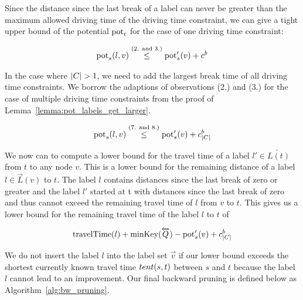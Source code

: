 Since the distance since the last break of a label can never be greater than the maximum allowed driving time of the driving time constraint, we can give a tight upper bound of the potential $\operatorname{pot}_t$ for the case of one driving time constraint:

\begin{align}
	\operatorname{pot}_s(l,v) \overset{\text{(2. and 3.)}}{\le} \operatorname{pot}'_s(v) + c^b
\end{align}

In the case where $|C| > 1$, we need to add the largest break time of all driving time constraints. We borrow the adaptions of observations (2.) and (3.) for the case of multiple driving time constraints from the proof of Lemma~\ref{lemma:pot_labels_get_larger}.

\begin{align}
	\operatorname{pot}_s(l,v) \overset{\text{(7. and 8.)}}{\le} \operatorname{pot}'_s(v) + c_{|C|}^b
\end{align}

We now can to compute a lower bound for the travel time of a label $l' \in \overleftarrow{L(t)}$ from $t$ to any node $v$. This is a lower bound for the remaining distance of a label $l \in \overrightarrow{L}(v)$ to $t$. The label $l$ contains distances since the last break of zero or greater and the label $l'$ started at t with distances since the last break of zero and thus cannot exceed the remaining travel time of $l$ from $v$ to $t$. This gives us a lower bound for the remaining travel time of the label $l$ to $t$ of

\begin{align}
	\operatorname{travelTime}(l) + \operatorname{minKey}(\overleftarrow{Q}) - \operatorname{pot}'_s(v) + c_{|C|}^b
\end{align}

We do not insert the label $l$ into the label set $\overrightarrow{v}$ if our lower bound exceeds the shortest currently known travel time $tent(s,t)$ between $s$ and $t$ because the label $l$ cannot lead to an improvement. Our final backward pruning is defined below as Algorithm~\ref{alg:bw_pruning}.

